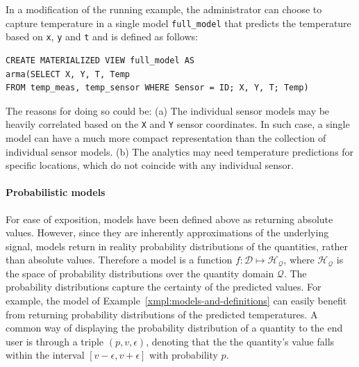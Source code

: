 \vspace*{0.5cm}
\begin{example}
In a modification of the running example, the administrator can choose to capture temperature in a single model \texttt{full\_model} that predicts the temperature based on \texttt{x}, \texttt{y} and \texttt{t} and is defined as follows:
\begin{verbatim}
CREATE MATERIALIZED VIEW full_model AS 
arma(SELECT X, Y, T, Temp
FROM temp_meas, temp_sensor WHERE Sensor = ID; X, Y, T; Temp)
\end{verbatim}

The reasons for doing so could be: (a) The individual sensor models may be heavily correlated based on the \texttt{X} and \texttt{Y} sensor coordinates. In such case, a single model can have a much more compact representation than the collection of individual sensor models.
(b) The analytics may need temperature predictions for specific locations, which do not coincide with any individual sensor.
\end{example}
\vspace*{0.5cm}


\paragraph{Probabilistic models} For ease of exposition, models have been defined above as returning absolute values. However, since they are inherently approximations of the underlying signal, models return in reality probability distributions of the quantities, rather than absolute values. Therefore a model is a function $f:\mathcal{D}\mapsto \mathcal{H_{Q}}$, where $\mathcal{H_{Q}}$ is the space of probability distributions over the quantity domain $\mathcal{Q}$. The probability distributions capture the certainty of the predicted values. For example, the model of Example~\ref{xmpl:models-and-definitions} can easily benefit from returning probability distributions of the predicted temperatures. A common way of displaying the probability distribution of a quantity to the end user is through a triple $(p, v, \epsilon)$, denoting that the the quantity's value falls within the interval $[v - \epsilon, v + \epsilon]$ with probability $p$.\\

